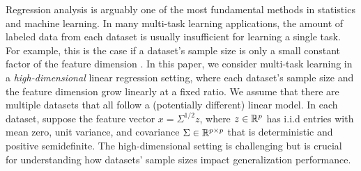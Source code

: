 
Regression analysis is arguably one of the most fundamental methods in statistics and machine learning.
In many multi-task learning applications, the amount of labeled data from each dataset is usually insufficient for learning a single task.
For example, this is the case if a dataset's sample size is only a small constant factor of the feature dimension \cite{GLUE}.
In this paper, we consider multi-task learning in a \textit{high-dimensional} linear regression setting, where each dataset's sample size and the feature dimension grow linearly at a fixed ratio.
We assume that there are multiple datasets that all follow a (potentially different) linear model.
In each dataset, suppose the feature vector $x = {\Sigma}^{1/2} z$, where $z \in \mathbb{R}^p$ has i.i.d entries with mean zero, unit variance, and covariance $\Sigma \in\mathbb{R}^{p \times p}$ that is deterministic and positive semidefinite.
The high-dimensional setting is challenging but is crucial for understanding how datasets' sample sizes impact generalization performance.

